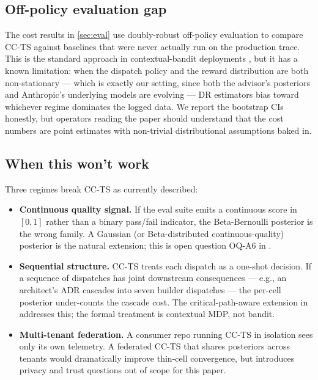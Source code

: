 \subsection{Off-policy evaluation gap}

The cost results in \cref{sec:eval} use doubly-robust off-policy evaluation
\cite{dudik2014doubly} to compare CC-TS against baselines that were never
actually run on the production trace. This is the standard approach in
contextual-bandit deployments \cite{agarwal2016making}, but it has a
known limitation: when the dispatch policy and the reward distribution are
both non-stationary --- which is exactly our setting, since both the
advisor's posteriors and Anthropic's underlying models are evolving --- DR
estimators bias toward whichever regime dominates the logged data. We
report the bootstrap CIs honestly, but operators reading the paper should
understand that the cost numbers are point estimates with non-trivial
distributional assumptions baked in.

\subsection{When this won't work}

Three regimes break CC-TS as currently described:

\begin{itemize}[leftmargin=*]
  \item \textbf{Continuous quality signal.} If the eval suite emits a
        continuous score in $[0, 1]$ rather than a binary pass/fail
        indicator, the Beta-Bernoulli posterior is the wrong family. A
        Gaussian (or Beta-distributed continuous-quality) posterior is the
        natural extension; this is open question OQ-A6 in
        \cite{blackrim_moa1c}.
  \item \textbf{Sequential structure.} CC-TS treats each dispatch as a
        one-shot decision. If a sequence of dispatches has joint downstream
        consequences --- e.g., an architect's ADR cascades into seven
        builder dispatches --- the per-cell posterior under-counts the
        cascade cost. The critical-path-aware extension in
        \cite{blackrim_moa10} addresses this; the formal treatment is
        contextual MDP, not bandit.
  \item \textbf{Multi-tenant federation.} A consumer repo running CC-TS in
        isolation sees only its own telemetry. A federated CC-TS that
        shares posteriors across tenants would dramatically improve
        thin-cell convergence, but introduces privacy and trust questions
        out of scope for this paper.
\end{itemize}

